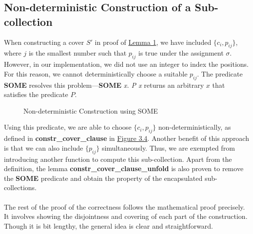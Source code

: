 \subsection*{Non-deterministic Construction of a Sub-collection}
When constructing a cover $S'$ in proof of \hyperref[lemma:1]{Lemma 1}, we have included $\{c_i, p_{ij}\}$, where $j$ is the smallest number 
such that $p_{ij}$ is true under the assignment $\sigma$. However, in our implementation, 
we did not use an integer to index the positions. For this reason, we cannot deterministically choose 
a suitable $p_{ij}$. The predicate \textbf{SOME} resolves this problem---\textbf{SOME} \textit{x. P x}
returns an arbitrary $x$ that satisfies the predicate $P$.
\begin{figure}[h!]
\caption{Non-deterministic Construction using SOME}
\label{figure:7}
\end{figure} 
Using this predicate, we are able to choose $\{c_i, p_{ij}\}$ non-deterministically, as defined in \textbf{constr\_cover\_clause} in \hyperref[fig:7]{Figure 3.4}. 
Another benefit of this approach is that we can also include $\{p_{ij}\}$ simultaneously. Thus, we are exempted from introducing another function 
to compute this sub-collection. Apart from the definition, the lemma \textbf{constr\_cover\_clause\_unfold} is also proven to remove the \textbf{SOME}
predicate and obtain the property of the encapsulated sub-collections. \\\\
The rest of the proof of the correctness follows the mathematical proof precisely. 
It involves showing the disjointness and covering of each part of the construction. 
Though it is bit lengthy, the general idea is clear and straightforward.


